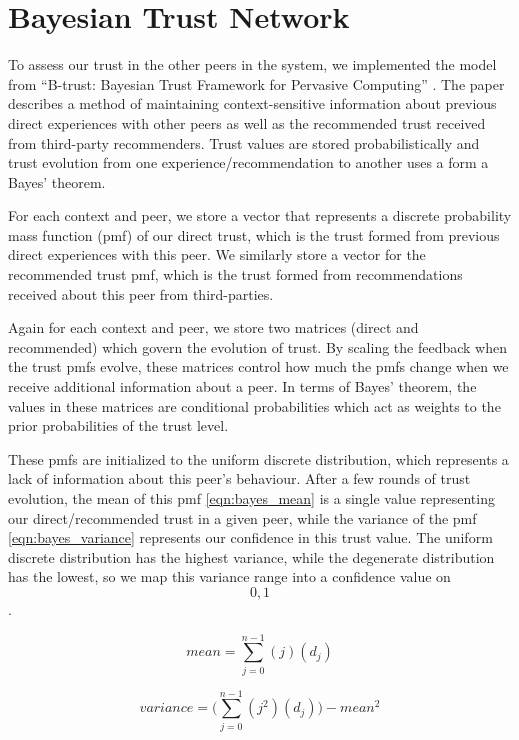 \section{Bayesian Trust Network}
To assess our trust in the other peers in the system, we implemented the model
from ``B-trust: Bayesian Trust Framework for Pervasive Computing''
\cite{btrust}. The paper describes a method of maintaining context-sensitive
information about previous direct experiences with other peers as well as
the recommended trust received from third-party recommenders. Trust values
are stored probabilistically and trust evolution from one
experience/recommendation to another uses a form a Bayes' theorem.

For each context and peer, we store a vector that represents a discrete
probability mass function (pmf) of our direct trust, which is the trust
formed from previous direct experiences with this peer. We similarly store a
vector for the recommended trust pmf, which is the trust formed from
recommendations received about this peer from third-parties.

Again for each context and peer, we store two matrices (direct and recommended)
which govern the evolution of trust. By scaling the feedback when the trust
pmfs evolve, these matrices control how much the pmfs change when we receive
additional information about a peer. In terms of Bayes' theorem, the
values in these matrices are conditional probabilities which act as weights
to the prior probabilities of the trust level.

These pmfs are initialized to the uniform discrete distribution, which
represents a lack of information about this peer's behaviour. After a few rounds
of trust evolution, the mean of this pmf \eqref{eqn:bayes_mean} is a single
value representing our direct/recommended trust in a given peer, while
the variance of the pmf \eqref{eqn:bayes_variance} represents our confidence in
this trust value. The uniform discrete distribution has the highest variance,
while the degenerate distribution has the lowest, so we map this variance range
into a confidence value on \[0,1\].

\begin{figure}[h]
\label{eqn:bayes_mean}
\begin{equation}
mean = \sum_{j=0}^{n-1}{(j)(d_j)}
\end{equation}
\end{figure}

\begin{figure}[h]
\label{eqn:bayes_variance}
\begin{equation}
variance = \bigg(\sum_{j=0}^{n-1}{(j^2)(d_j)} \bigg) - mean^2
\end{equation}
\end{figure}
